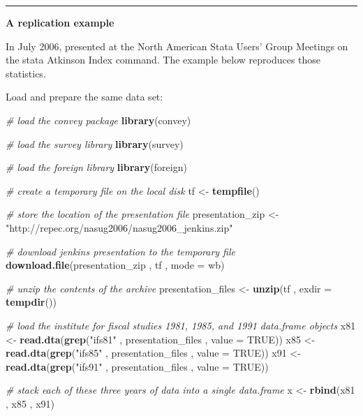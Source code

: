 \documentclass[
]{book}
\newenvironment{Shaded}{\begin{snugshade}}{\end{snugshade}}
\newcommand{\AttributeTok}[1]{\textcolor[rgb]{0.13,0.29,0.53}{#1}}
\newcommand{\CommentTok}[1]{\textcolor[rgb]{0.56,0.35,0.01}{\textit{#1}}}
\newcommand{\ConstantTok}[1]{\textcolor[rgb]{0.56,0.35,0.01}{#1}}
\newcommand{\FunctionTok}[1]{\textcolor[rgb]{0.13,0.29,0.53}{\textbf{#1}}}
\newcommand{\NormalTok}[1]{#1}
\newcommand{\OtherTok}[1]{\textcolor[rgb]{0.56,0.35,0.01}{#1}}
\newcommand{\StringTok}[1]{\textcolor[rgb]{0.31,0.60,0.02}{#1}}
\begin{document}
\begin{center}\rule{0.5\linewidth}{0.5pt}\end{center}

\textbf{A replication example}

In July 2006, \textcite{jenkins2006} presented at the North American Stata Users' Group Meetings on the stata Atkinson Index command. The example below reproduces those statistics.

Load and prepare the same data set:

\begin{Shaded}
\begin{Highlighting}[]
\CommentTok{\# load the convey package}
\FunctionTok{library}\NormalTok{(convey)}

\CommentTok{\# load the survey library}
\FunctionTok{library}\NormalTok{(survey)}

\CommentTok{\# load the foreign library}
\FunctionTok{library}\NormalTok{(foreign)}

\CommentTok{\# create a temporary file on the local disk}
\NormalTok{tf }\OtherTok{\textless{}{-}} \FunctionTok{tempfile}\NormalTok{()}

\CommentTok{\# store the location of the presentation file}
\NormalTok{presentation\_zip }\OtherTok{\textless{}{-}}
  \StringTok{"http://repec.org/nasug2006/nasug2006\_jenkins.zip"}

\CommentTok{\# download jenkins\textquotesingle{} presentation to the temporary file}
\FunctionTok{download.file}\NormalTok{(presentation\_zip , tf , }\AttributeTok{mode =} \StringTok{\textquotesingle{}wb\textquotesingle{}}\NormalTok{)}

\CommentTok{\# unzip the contents of the archive}
\NormalTok{presentation\_files }\OtherTok{\textless{}{-}} \FunctionTok{unzip}\NormalTok{(tf , }\AttributeTok{exdir =} \FunctionTok{tempdir}\NormalTok{())}

\CommentTok{\# load the institute for fiscal studies\textquotesingle{} 1981, 1985, and 1991 data.frame objects}
\NormalTok{x81 }\OtherTok{\textless{}{-}}
  \FunctionTok{read.dta}\NormalTok{(}\FunctionTok{grep}\NormalTok{(}\StringTok{"ifs81"}\NormalTok{ , presentation\_files , }\AttributeTok{value =} \ConstantTok{TRUE}\NormalTok{))}
\NormalTok{x85 }\OtherTok{\textless{}{-}}
  \FunctionTok{read.dta}\NormalTok{(}\FunctionTok{grep}\NormalTok{(}\StringTok{"ifs85"}\NormalTok{ , presentation\_files , }\AttributeTok{value =} \ConstantTok{TRUE}\NormalTok{))}
\NormalTok{x91 }\OtherTok{\textless{}{-}}
  \FunctionTok{read.dta}\NormalTok{(}\FunctionTok{grep}\NormalTok{(}\StringTok{"ifs91"}\NormalTok{ , presentation\_files , }\AttributeTok{value =} \ConstantTok{TRUE}\NormalTok{))}

\CommentTok{\# stack each of these three years of data into a single data.frame}
\NormalTok{x }\OtherTok{\textless{}{-}} \FunctionTok{rbind}\NormalTok{(x81 , x85 , x91)}
\end{Highlighting}
\end{Shaded}
\end{document}
